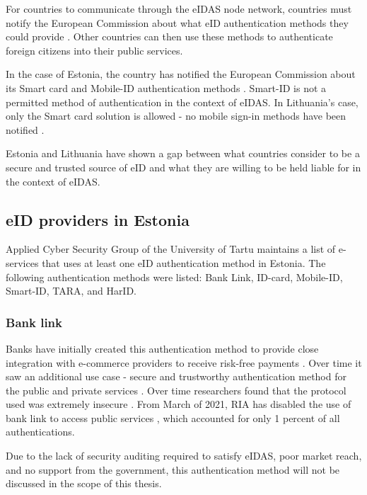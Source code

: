 For countries to communicate through the eIDAS node network, countries must notify the European Commission about what eID authentication methods they could provide \cite{eulaw-eidas}. Other countries can then use these methods to authenticate foreign citizens into their public services.

In the case of Estonia, the country has notified the European Commission about its Smart card and Mobile-ID authentication methods \cite{eulaw-eidas-notified}. Smart-ID is not a permitted method of authentication in the context of eIDAS. In Lithuania's case, only the Smart card solution is allowed - no mobile sign-in methods have been notified \cite{eulaw-eidas-notified}.

Estonia and Lithuania have shown a gap between what countries consider to be a secure and trusted source of eID and what they are willing to be held liable for in the context of eIDAS.

\subsection{eID providers in Estonia}

Applied Cyber Security Group of the University of Tartu maintains a list of e-services \cite{ut-eidinestonia} that uses at least one eID authentication method in Estonia. The following authentication methods were listed: Bank Link, ID-card, Mobile-ID, Smart-ID, TARA, and HarID. 

\subsubsection{Bank link}

Banks have initially created this authentication method to provide close integration with e-commerce providers to receive risk-free payments \cite{kerem2003internet}. Over time it saw an additional use case - secure and trustworthy authentication method for the public and private services \cite{sebbanklink}. Over time researchers found that the protocol used was extremely insecure \cite{banklinksecurityanalysis}. From March of 2021, RIA has disabled the use of bank link to access public services \cite{ria-deprecates-bank-link}, which accounted for only 1 percent of all authentications.

Due to the lack of security auditing required to satisfy eIDAS, poor market reach, and no support from the government, this authentication method will not be discussed in the scope of this thesis.

